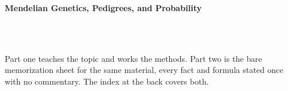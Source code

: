 



\makeindex[title={Index of This Volume},columns=2,intoc]

\begin{titlepage}\thispagestyle{empty}
\vspace*{0.14\textheight}
\noindent{\color{tiercore}\rule{\textwidth}{5pt}}\\[3pt]
\noindent{\color{bioline}\rule{\textwidth}{1pt}}\\[26pt]
\\[12pt]
\noindent\begin{minipage}{\textwidth}\raggedright
{\sffamily\bfseries\fontsize{28}{32}\selectfont\color{bioink}%
 \hyphenchar{} Mendelian Genetics, Pedigrees, and Probability\par}\end{minipage}\\[16pt]
\noindent{\color{biogreen}\rule{\textwidth}{1.4pt}}\\[10pt]
\noindent\begin{minipage}{\textwidth}\raggedright
{\fontsize{10.5}{14}\selectfont\color{biogreen}%
Part one teaches the topic and works the methods. Part two is the bare memorization sheet for the
same material, every fact and formula stated once with no commentary. The index at the back covers both.\par}\end{minipage}
\vfill
\noindent{\color{bioline}\rule{\textwidth}{1pt}}\\[3pt]
\noindent{\color{tiercore}\rule{\textwidth}{5pt}}
\end{titlepage}
\tableofcontents
\clearpage
{}
\clearpage
\printindex

